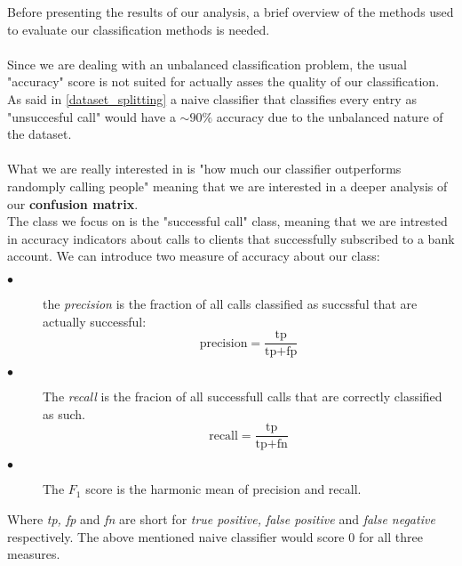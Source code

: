 Before presenting the results of our analysis, a brief overview of the methods used to evaluate our classification methods is needed. \\
\\
Since we are dealing with an unbalanced classification problem, the usual "accuracy" score is not suited for actually asses the quality of our classification. As said in \ref{dataset_splitting} a naive classifier that classifies every entry as "unsuccesful call" would have a \(\sim 90\%\) accuracy due to the unbalanced nature of the dataset.\\
\\
What we are really interested in is "how much our classifier outperforms randomply calling people" meaning that we are interested in a deeper analysis of our \textbf{confusion matrix}.
\\
The class we focus on is the "successful call" class, meaning that we are intrested in accuracy indicators about calls to clients that successfully subscribed to a bank account. We can introduce two measure of accuracy about our class:
\begin{description}
    \item [\(\bullet\)] the \textit{precision} is the fraction of all calls classified as succssful that are actually successful: \begin{equation}
        \text{precision} = \frac{\text{tp}}{\text{tp}+\text{fp}}
    \end{equation}
    \item[\(\bullet\)] The \textit{recall} is the fracion of all successfull calls that are correctly classified as such. \begin{equation*}
        \text{recall} = \frac{\text{tp}}{\text{tp} + \text{fn}}
    \end{equation*} 
    \item[\(\bullet\)] The \(F_1\) score is the harmonic mean of precision and recall.
\end{description}
Where \textit{tp, fp} and \textit{fn} are short for \textit{true positive, false positive} and \textit{false negative} respectively.
The above mentioned naive classifier would score \(0\) for all three measures.